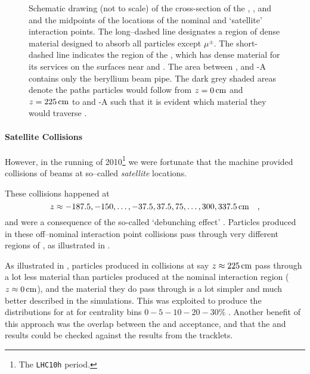 \begin{figure}[th!bp]
  \centering
  \caption{Schematic drawing (not to scale) of the cross-section of
    the \ITS{}, \FMD{}, and \VZERO{} and the midpoints of the
    locations of the nominal and `satellite' interaction points. The
    long--dashed line designates a region of dense material designed
    to absorb all particles except $\mu^{\pm}$. The short-dashed line
    indicates the region of the \ALICE{} \ITS{}, which has dense
    material for its services on the surfaces near  and
    . The area between ,  and \VZERO{}-A contains
    only the beryllium beam pipe. The dark grey shaded areas denote
    the paths particles would follow from $z=\unit[0]{\text{cm}}$ and
    $z=\unit[225]{\text{cm}}$ to  and \VZERO{}-A such that it
    is evident which material they would traverse
    \cite{Abbas:2013bpa}.}
  \label{fig:satellite_geom}
\end{figure}

\paragraph{Satellite Collisions} 
However, in the \PbPbCol{} running of 2010\footnote{The
  \texttt{LHC10h} period.} we were fortunate that the machine provided
collisions of beams at so--called \emph{satellite} locations.

These collisions happened at
$$
z \approx -187.5, -150, \ldots, -37.5, 37.5, 75, \ldots, 300,
\unit[337.5]{\text{cm}} \quad, 
$$ 
and were a consequence of the so-called `debunching effect'
\cite{maxime}.  Particles produced in these off--nominal interaction
point collisions pass through very different regions of \ALICE{}, as
illustrated in .  

As illustrated in , particles produced in
collisions at say $z\approx\unit[225]{\text{cm}}$ pass through a lot
less material than particles produced at the nominal interaction
region ($z\approx\unit[0]{\text{cm}}$), and the material they do pass
through is a lot simpler and much better described in the simulations.
This was exploited to produce the \ndndeta{} distributions for
\PbPbCol{} at  for centrality bins $0-5-10-20-30\%$
\cite{Abbas:2013bpa}.  Another benefit of this approach was the
overlap between the \FMD{} and \VZERO{} acceptance, and that the
\VZERO{} and \FMD{} results could be checked against the results from
the \SPD{} tracklets.

